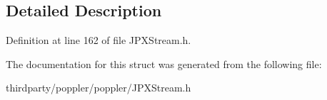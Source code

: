 \subsection{Detailed Description}


Definition at line 162 of file J\+P\+X\+Stream.\+h.



The documentation for this struct was generated from the following file\+:\begin{DoxyCompactItemize}
\item 
thirdparty/poppler/poppler/J\+P\+X\+Stream.\+h\end{DoxyCompactItemize}
